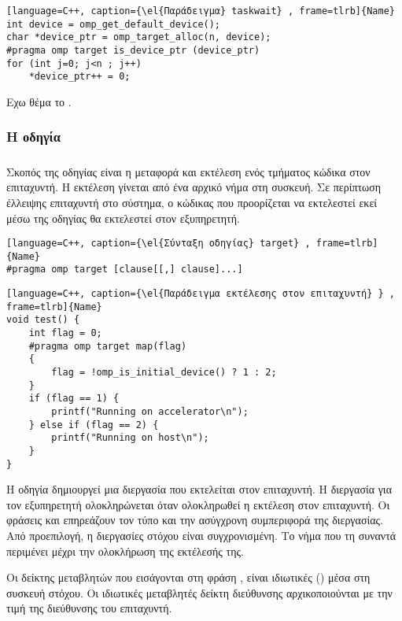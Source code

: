 \begin{lstlisting}[language=C++, caption={\el{Παράδειγμα} taskwait} , frame=tlrb]{Name}
int device = omp_get_default_device();
char *device_ptr = omp_target_alloc(n, device);
#pragma omp target is_device_ptr (device_ptr)
for (int j=0; j<n ; j++)
	*device_ptr++ = 0;
\end{lstlisting}
Εχω θέμα το .
\clearpage


\subsubsection{Η οδηγία }
\subparagraph{}
Σκοπός της οδηγίας  είναι η μεταφορά και εκτέλεση ενός τμήματος κώδικα στον επιταχυντή. Η εκτέλεση γίνεται από ένα αρχικό νήμα στη συσκευή. Σε περίπτωση έλλειψης επιταχυντή στο σύστημα, ο κώδικας που προορίζεται να εκτελεστεί εκεί μέσω της οδηγίας \emph{} θα εκτελεστεί στον εξυπηρετητή.

\begin{lstlisting}[language=C++, caption={\el{Σύνταξη οδηγίας} target} , frame=tlrb]{Name}
#pragma omp target [clause[[,] clause]...]
\end{lstlisting}

\begin{lstlisting}[language=C++, caption={\el{Παράδειγμα εκτέλεσης στον επιταχυντή} } , frame=tlrb]{Name}
void test() {
	int flag = 0;
	#pragma omp target map(flag)
	{
		flag = !omp_is_initial_device() ? 1 : 2;
	}
	if (flag == 1) {
		printf("Running on accelerator\n");
	} else if (flag == 2) {
		printf("Running on host\n");
	}
}
\end{lstlisting}

Η οδηγία \emph{} δημιουργεί μια διεργασία που εκτελείται στον επιταχυντή. Η διεργασία για τον εξυπηρετητή ολοκληρώνεται όταν ολοκληρωθεί η εκτέλεση στον επιταχυντή. Οι φράσεις \emph{} και \emph{} επηρεάζουν τον τύπο και την ασύγχρονη συμπεριφορά της διεργασίας. Από προεπιλογή, η διεργασίες στόχου είναι συγχρονισμένη. Το νήμα που τη συναντά περιμένει μέχρι την ολοκλήρωση της εκτέλεσής της.

Οι δείκτης μεταβλητών που εισάγονται στη φράση \emph{}, είναι ιδιωτικές (\emph{}) μέσα στη συσκευή στόχου. Οι ιδιωτικές μεταβλητές δείκτη διεύθυνσης αρχικοποιούνται με την τιμή της διεύθυνσης του επιταχυντή.

